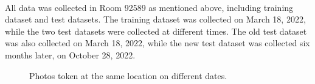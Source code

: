 \documentclass[a4paper,12pt]{report}
\begin{document}
\paragraph{}
All data was collected in Room 92589 as mentioned above, including training dataset and test datasets. The training dataset was collected on March 18, 2022, while the two test datasets were collected at different times. The old test dataset was also collected on March 18, 2022, while the new test dataset was collected six months later, on October 28, 2022.
\begin{figure}[htbp]
    \centering
    \caption{Photos token at the same location on different dates.}
    \label{Fig:scene}
\end{figure}
\end{document}
